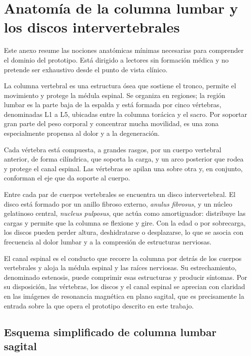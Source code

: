 \chapter{Anatomía de la columna lumbar y los discos intervertebrales}
\label{anexo:anatomia-lumbar}
\label{anexo:figuras-anatomicas}

Este anexo resume las nociones anatómicas mínimas necesarias para comprender el dominio del prototipo. Está dirigido a lectores sin formación médica y no pretende ser exhaustivo desde el punto de vista clínico.

La columna vertebral es una estructura ósea que sostiene el tronco, permite el movimiento y protege la médula espinal. Se organiza en regiones; la región lumbar es la parte baja de la espalda y está formada por cinco vértebras, denominadas L1 a L5, ubicadas entre la columna torácica y el sacro. Por soportar gran parte del peso corporal y concentrar mucha movilidad, es una zona especialmente propensa al dolor y a la degeneración.

Cada vértebra está compuesta, a grandes rasgos, por un cuerpo vertebral anterior, de forma cilíndrica, que soporta la carga, y un arco posterior que rodea y protege el canal espinal. Las vértebras se apilan una sobre otra y, en conjunto, conforman el eje que da soporte al cuerpo.

Entre cada par de cuerpos vertebrales se encuentra un disco intervertebral. El disco está formado por un anillo fibroso externo, \textit{anulus fibrosus}, y un núcleo gelatinoso central, \textit{nucleus pulposus}, que actúa como amortiguador: distribuye las cargas y permite que la columna se flexione y gire. Con la edad o por sobrecarga, los discos pueden perder altura, deshidratarse o desplazarse, lo que se asocia con frecuencia al dolor lumbar y a la compresión de estructuras nerviosas.

El canal espinal es el conducto que recorre la columna por detrás de los cuerpos vertebrales y aloja la médula espinal y las raíces nerviosas. Su estrechamiento, denominado estenosis, puede comprimir esas estructuras y producir síntomas. Por su disposición, las vértebras, los discos y el canal espinal se aprecian con claridad en las imágenes de resonancia magnética en plano sagital, que es precisamente la entrada sobre la que opera el prototipo descrito en este trabajo.

\section{Esquema simplificado de columna lumbar sagital}

